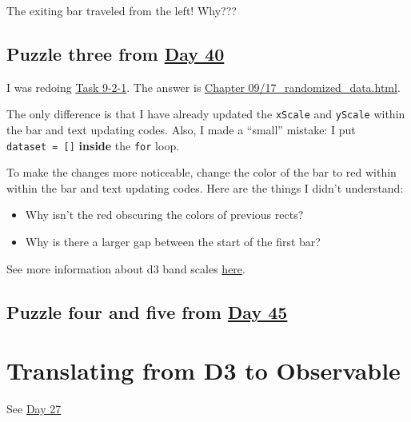 \documentclass[
]{book}
\begin{document}
The exiting bar traveled from the left! Why???

\hypertarget{puzzle-three-from-day-40}{%
\subsection{\texorpdfstring{Puzzle three from \href{https://observablehq.com/@hongtaoh/day-40-2020-10-03}{Day 40}}{Puzzle three from Day 40}}\label{puzzle-three-from-day-40}}

I was redoing \href{https://d3.hongtaoh.com/task-9-2.html}{Task 9-2-1}. The answer is \href{https://github.com/scotthmurray/d3-book/blob/master/chapter_09/17_randomized_data.html}{Chapter 09/17\_randomized\_data.html}.

The only difference is that I have already updated the \texttt{xScale} and \texttt{yScale} within the bar and text updating codes. Also, I made a ``small'' mistake: I put \texttt{dataset\ =\ {[}{]}} \textbf{inside} the \texttt{for} loop.

To make the changes more noticeable, change the color of the bar to red within within the bar and text updating codes. Here are the things I didn't understand:

\begin{itemize}
\item
  Why isn't the red obscuring the colors of previous rects?
\item
  Why is there a larger gap between the start of the first bar?
\end{itemize}

See more information about d3 band scales \href{https://github.com/d3/d3-scale\#band-scales}{here}.

\hypertarget{puzzle-four-and-five-from-day-45}{%
\subsection{\texorpdfstring{Puzzle four and five from \href{https://observablehq.com/@hongtaoh/day-45-2020-10-07}{Day 45}}{Puzzle four and five from Day 45}}\label{puzzle-four-and-five-from-day-45}}

\hypertarget{translating-from-d3-to-observable}{%
\section{Translating from D3 to Observable}\label{translating-from-d3-to-observable}}

See \href{https://observablehq.com/@hongtaoh/day-twenty-seven-2020-09-20}{Day 27}
\end{document}
